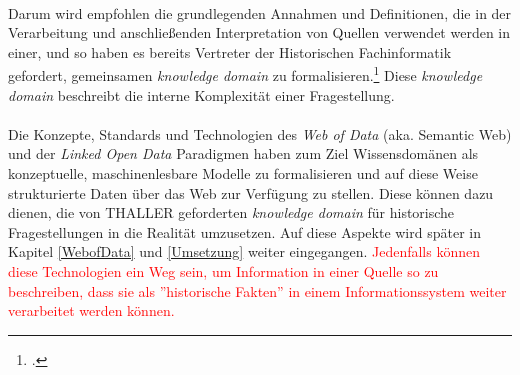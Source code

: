 \documentclass[12pt,a4paper]{article}
\begin{document}
\\
Darum wird empfohlen die grundlegenden Annahmen und Definitionen, die in der Verarbeitung und anschließenden Interpretation von Quellen verwendet werden in einer, und so haben es bereits Vertreter der Historischen Fachinformatik gefordert, gemeinsamen \textit{knowledge domain} zu formalisieren.\footcite[][S.263]{thaller2017historical} Diese \textit{knowledge domain} beschreibt die interne Komplexität einer Fragestellung.
\\
\\
Die Konzepte, Standards und Technologien des \textit{Web of Data} (aka. Semantic Web) und der \textit{Linked Open Data} Paradigmen haben zum Ziel Wissensdomänen als konzeptuelle, maschinenlesbare Modelle zu formalisieren und auf diese Weise strukturierte Daten über das Web zur Verfügung zu stellen. Diese können dazu dienen, die von THALLER geforderten \textit{knowledge domain} für historische Fragestellungen in die Realität umzusetzen. Auf diese Aspekte wird später in Kapitel \ref{WebofData} und \ref{Umsetzung} weiter eingegangen.
\textcolor{red}
{Jedenfalls können diese Technologien ein Weg sein, um Information in einer Quelle so zu beschreiben, dass sie als ''historische Fakten'' in einem Informationssystem weiter verarbeitet werden können.
}

\end{document}

